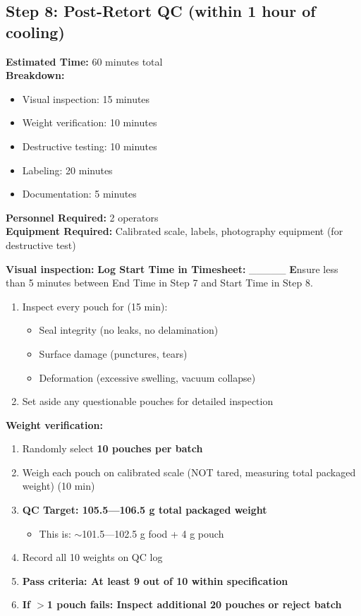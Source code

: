 {%

\subsection*{Step 8: Post-Retort QC (within 1 hour of cooling)}

\textbf{Estimated Time:} 60 minutes total \\
\textbf{Breakdown:}
\begin{itemize}
\item Visual inspection: 15 minutes
\item Weight verification: 10 minutes
\item Destructive testing: 10 minutes
\item Labeling: 20 minutes
\item Documentation: 5 minutes
\end{itemize}
\textbf{Personnel Required:} 2 operators \\
\textbf{Equipment Required:} Calibrated scale, labels, photography equipment (for destructive test)

\vspace{0.5em}
\textbf{Visual inspection:}
\textbf{Log Start Time in Timesheet:} \_\_\_\_\_
\textbf Ensure less than 5 minutes between End Time in Step 7 and Start Time in Step 8. 
\begin{enumerate}[leftmargin=1.5em]
\item Inspect 
every pouch for (15 min):
  \begin{itemize}
  \item Seal integrity (no leaks, no delamination)
  \item Surface damage (punctures, tears)
  \item Deformation (excessive swelling, vacuum collapse)
  \end{itemize}
\item Set aside any questionable pouches for detailed inspection
\end{enumerate}

\textbf{Weight verification:}
\begin{enumerate}[resume,leftmargin=1.5em]
\item Randomly select \textbf{10 pouches per batch}
\item Weigh each pouch on calibrated scale (NOT tared, measuring total packaged weight) (10 min)
\item \textbf{QC Target: 105.5---106.5 g total packaged weight}
  \begin{itemize}
  \item This is: $\sim$101.5---102.5 g food + 4 g pouch
  \end{itemize}
\item Record all 10 weights on QC log
\item \textbf{Pass criteria: At least 9 out of 10 within specification}
\item \textbf{If $>$1 
pouch fails: Inspect additional 20 pouches or reject batch}
\end{enumerate}

}

